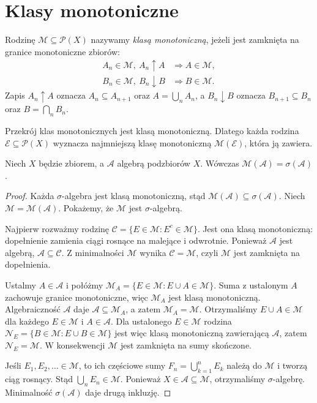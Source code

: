 \section{Klasy monotoniczne}

\begin{definicja}
\label{def:monotone-class}
Rodzinę $\mathcal M\subseteq\mathcal P(X)$ nazywamy \emph{klasą
monotoniczną}, jeżeli jest zamknięta na granice monotoniczne zbiorów:
\begin{align*}
A_n\in\mathcal M,\ A_n\uparrow A
&\Longrightarrow A\in\mathcal M,\\
B_n\in\mathcal M,\ B_n\downarrow B
&\Longrightarrow B\in\mathcal M.
\end{align*}
Zapis $A_n\uparrow A$ oznacza $A_n\subseteq A_{n+1}$ oraz
$A=\bigcup_nA_n$, a $B_n\downarrow B$ oznacza
$B_{n+1}\subseteq B_n$ oraz $B=\bigcap_nB_n$.
\end{definicja}

Przekrój klas monotonicznych jest klasą monotoniczną. Dlatego każda
rodzina $\mathcal E\subseteq\mathcal P(X)$ wyznacza najmniejszą klasę
monotoniczną $\mathcal M(\mathcal E)$, która ją zawiera.

\begin{twierdzenie}
\label{thm:monotone-class}
Niech $X$ będzie zbiorem, a $\mathcal A$ algebrą podzbiorów $X$.
Wówczas $\mathcal M(\mathcal A)=\sigma(\mathcal A)$.
\end{twierdzenie}
\begin{proof}
Każda $\sigma$-algebra jest klasą monotoniczną, stąd
$\mathcal M(\mathcal A)\subseteq\sigma(\mathcal A)$.
Niech $\mathcal M=\mathcal M(\mathcal A)$. Pokażemy, że $\mathcal M$
jest $\sigma$-algebrą.

Najpierw rozważmy rodzinę
$\mathcal C=\{E\in\mathcal M:E^c\in\mathcal M\}$.
Jest ona klasą monotoniczną: dopełnienie zamienia ciągi rosnące
na malejące i odwrotnie. Ponieważ $\mathcal A$ jest algebrą,
$\mathcal A\subseteq\mathcal C$. Z minimalności $\mathcal M$
wynika $\mathcal C=\mathcal M$, czyli $\mathcal M$ jest zamknięta
na dopełnienia.

Ustalmy $A\in\mathcal A$ i połóżmy
$\mathcal M_A=\{E\in\mathcal M:E\cup A\in\mathcal M\}$.
Suma z ustalonym $A$ zachowuje granice monotoniczne, więc
$\mathcal M_A$ jest klasą monotoniczną. Algebraiczność $\mathcal A$
daje $\mathcal A\subseteq\mathcal M_A$, a zatem
$\mathcal M_A=\mathcal M$. Otrzymaliśmy
$E\cup A\in\mathcal M$ dla każdego $E\in\mathcal M$ i $A\in\mathcal A$.
Dla ustalonego $E\in\mathcal M$ rodzina
$\mathcal N_E=\{B\in\mathcal M:E\cup B\in\mathcal M\}$
jest więc klasą monotoniczną zawierającą $\mathcal A$, zatem
$\mathcal N_E=\mathcal M$. W konsekwencji $\mathcal M$ jest zamknięta
na sumy skończone.

Jeśli $E_1,E_2,\ldots\in\mathcal M$, to ich częściowe sumy
$F_n=\bigcup_{k=1}^nE_k$ należą do $\mathcal M$ i tworzą ciąg
rosnący. Stąd $\bigcup_nE_n\in\mathcal M$. Ponieważ
$X\in\mathcal A\subseteq\mathcal M$, otrzymaliśmy $\sigma$-algebrę.
Minimalność $\sigma(\mathcal A)$ daje drugą inkluzję.
\end{proof}

